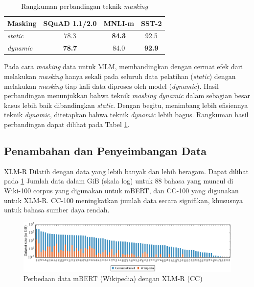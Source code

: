     \begin{table}[b]
        \centering
        \caption{Rangkuman perbandingan teknik \textit{masking} \parencite{Liu_Ott_Goyal_Du_Joshi_Chen_Levy_Lewis_Zettlemoyer_Stoyanov_2019} }
        \begin{tabular}{lccc}
            \hline
            \textbf{Masking} & \textbf{SQuAD 1.1/2.0} & \textbf{MNLI-m} & \textbf{SST-2} \\ \hline
            \textit{static}  & 78.3                   & \textbf{84.3}   & 92.5           \\
            \textit{dynamic} & \textbf{78.7}          & 84.0            & \textbf{92.9}  \\ \hline
        \end{tabular}
        \label{tab:rangkuman_roberta_2}
    \end{table}

    Pada cara \textit{masking} data untuk MLM, \parencite{Liu_Ott_Goyal_Du_Joshi_Chen_Levy_Lewis_Zettlemoyer_Stoyanov_2019} membandingkan dengan cermat efek dari melakukan \textit{masking} hanya sekali pada seluruh data pelatihan (\textit{static}) dengan melakukan \textit{masking} tiap kali data diproses oleh model (\textit{dynamic}). Hasil perbandingan menunjukkan bahwa teknik \textit{masking} \textit{dynamic} dalam sebagian besar kasus lebih baik dibandingkan \textit{static}. Dengan begitu, menimbang lebih efisiennya teknik \textit{dynamic}, ditetapkan bahwa teknik \textit{dynamic} lebih bagus. Rangkuman hasil perbandingan dapat dilihat pada Tabel \ref{tab:rangkuman_roberta_2}.

    \subsection{Penambahan dan Penyeimbangan Data}
    XLM-R Dilatih dengan data yang lebih banyak dan lebih beragam. Dapat dilihat pada \ref{fig:data_xlm_r} Jumlah data dalam GiB (skala log) untuk 88 bahasa yang muncul di Wiki-100 corpus yang digunakan untuk mBERT, dan CC-100 yang digunakan untuk XLM-R. CC-100 meningkatkan jumlah data secara signifikan, khususnya untuk bahasa sumber daya rendah.

    \begin{figure}[ht]
        \centering
        \includegraphics[width=1\textwidth]{resources/data_xlm_r.png}
        \caption{Perbedaan data mBERT (Wikipedia) dengan XLM-R (CC) \parencite{Conneau_XLMR}}
        \label{fig:data_xlm_r}
    \end{figure}

